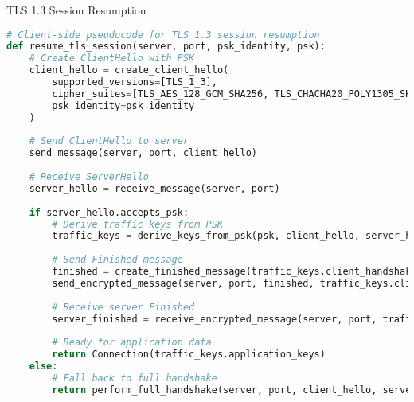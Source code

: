 \begin{examplecode}{TLS 1.3 Session Resumption}\\
\begin{lstlisting}[language=Python, style=basesmol]
# Client-side pseudocode for TLS 1.3 session resumption
def resume_tls_session(server, port, psk_identity, psk):
    # Create ClientHello with PSK
    client_hello = create_client_hello(
        supported_versions=[TLS_1_3],
        cipher_suites=[TLS_AES_128_GCM_SHA256, TLS_CHACHA20_POLY1305_SHA256],
        psk_identity=psk_identity
    )
    
    # Send ClientHello to server
    send_message(server, port, client_hello)
    
    # Receive ServerHello
    server_hello = receive_message(server, port)
    
    if server_hello.accepts_psk:
        # Derive traffic keys from PSK
        traffic_keys = derive_keys_from_psk(psk, client_hello, server_hello)
        
        # Send Finished message
        finished = create_finished_message(traffic_keys.client_handshake_key)
        send_encrypted_message(server, port, finished, traffic_keys.client_handshake_key)
        
        # Receive server Finished
        server_finished = receive_encrypted_message(server, port, traffic_keys.server_handshake_key)
        
        # Ready for application data
        return Connection(traffic_keys.application_keys)
    else:
        # Fall back to full handshake
        return perform_full_handshake(server, port, client_hello, server_hello)
\end{lstlisting}
\end{examplecode}